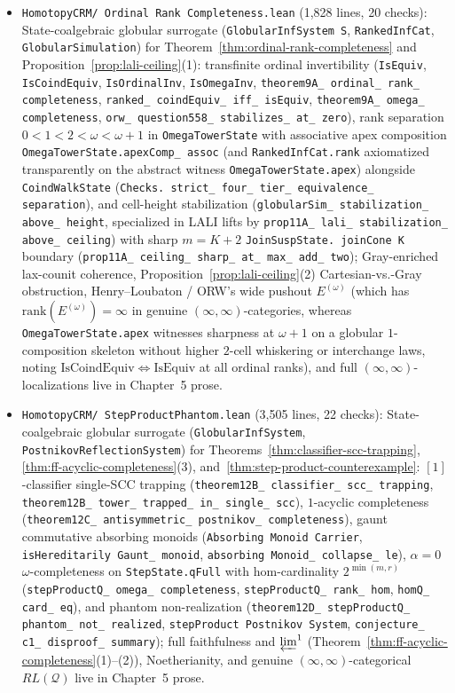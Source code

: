 \begin{itemize}
  \item \texttt{HomotopyCRM/ Ordinal Rank Completeness.lean} (1,828 lines, 20 checks): State-coalgebraic globular surrogate (\texttt{GlobularInfSystem S}, \texttt{RankedInfCat}, \texttt{GlobularSimulation}) for Theorem~\ref{thm:ordinal-rank-completeness} and Proposition~\ref{prop:lali-ceiling}(1): transfinite ordinal invertibility (\texttt{IsEquiv}, \texttt{IsCoindEquiv}, \texttt{IsOrdinalInv}, \texttt{IsOmegaInv}, \texttt{theorem9A\_ ordinal\_ rank\_ completeness}, \texttt{ranked\_ coindEquiv\_ iff\_ isEquiv}, \texttt{theorem9A\_ omega\_ completeness}, \texttt{orw\_ question558\_ stabilizes\_ at\_ zero}), rank separation $0 < 1 < 2 < \omega < \omega + 1$ in \texttt{OmegaTowerState} with associative apex composition \texttt{OmegaTowerState.apexComp\_ assoc} (and \texttt{RankedInfCat.rank} axiomatized transparently on the abstract witness \texttt{OmegaTowerState.apex}) alongside \texttt{CoindWalkState} (\texttt{Checks. strict\_ four\_ tier\_ equivalence\_ separation}), and cell-height stabilization (\texttt{globularSim\_ stabilization\_ above\_ height}, specialized in LALI lifts by \texttt{prop11A\_ lali\_ stabilization\_ above\_ ceiling}) with sharp $m = K + 2$ \texttt{JoinSuspState. joinCone K} boundary (\texttt{prop11A\_ ceiling\_ sharp\_ at\_ max\_ add\_ two}); Gray-enriched lax-counit coherence, Proposition~\ref{prop:lali-ceiling}(2) Cartesian-vs.-Gray obstruction, Henry--Loubaton / ORW's wide pushout $E^{(\omega)}$ (which has $\mathrm{rank}(E^{(\omega)}) = \infty$ in genuine $(\infty,\infty)$-categories, whereas \texttt{OmegaTowerState.apex} witnesses sharpness at $\omega + 1$ on a globular $1$-composition skeleton without higher $2$-cell whiskering or interchange laws, noting $\mathrm{IsCoindEquiv} \iff \mathrm{IsEquiv}$ at all ordinal ranks), and full $(\infty,\infty)$-localizations live in Chapter~5 prose.
  \item \texttt{HomotopyCRM/ StepProductPhantom.lean} (3,505 lines, 22 checks): State-coalgebraic globular surrogate (\texttt{GlobularInfSystem}, \texttt{PostnikovReflectionSystem}) for Theorems~\ref{thm:classifier-scc-trapping}, \ref{thm:ff-acyclic-completeness}(3), and~\ref{thm:step-product-counterexample}: $[1]$-classifier single-SCC trapping (\texttt{theorem12B\_ classifier\_ scc\_ trapping}, \texttt{theorem12B\_ tower\_ trapped\_ in\_ single\_ scc}), $1$-acyclic completeness (\texttt{theorem12C\_ antisymmetric\_ postnikov\_ completeness}), gaunt commutative absorbing monoids (\texttt{Absorbing Monoid Carrier}, \texttt{isHereditarily Gaunt\_ monoid}, \texttt{absorbing Monoid\_ collapse\_ le}), $\alpha = 0$ $\omega$-completeness on \texttt{StepState.qFull} with hom-cardinality $2^{\min(m,r)}$ (\texttt{stepProductQ\_ omega\_ completeness}, \texttt{stepProductQ\_ rank\_ hom}, \texttt{homQ\_ card\_ eq}), and phantom non-realization (\texttt{theorem12D\_ stepProductQ\_ phantom\_ not\_ realized}, \texttt{stepProduct Postnikov System}, \texttt{conjecture\_ c1\_ disproof\_ summary}); full faithfulness and $\varprojlim^1$ (Theorem~\ref{thm:ff-acyclic-completeness}(1)--(2)), Noetherianity, and genuine $(\infty,\infty)$-categorical $RL(\mathcal{Q})$ live in Chapter~5 prose.

\end{itemize}
